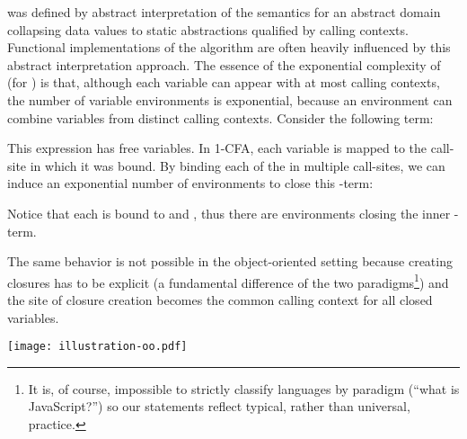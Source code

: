 \kCFA{} was defined by abstract interpretation of the \lc{} semantics for
an abstract domain collapsing data values to static abstractions
qualified by  calling contexts. Functional implementations of the
algorithm are often heavily influenced by this abstract interpretation
approach.  The essence of the exponential complexity of \kCFA{} (for
) is that, although each variable can appear with at most
 calling contexts, the number of variable environments is
exponential, because an environment can combine variables from
distinct calling contexts.  Consider the following term:

This expression has  free variables.  In 1-CFA, each variable is
mapped to the call-site in which it was bound.  By binding each of the
 in multiple call-sites, we can induce an exponential number of
environments to close this -term:

Notice that each  is bound to  and , thus there are 
environments closing the inner -term.

The same behavior is not possible in the object-oriented setting
because creating closures has to be explicit (a fundamental difference
of the two paradigms\footnote{It is, of course, impossible to strictly
classify languages by paradigm (``what is JavaScript?'') so our
statements reflect typical, rather than universal, practice.}) and the
site of closure creation becomes the common calling context for all
closed variables.

\begin{figure*}[tbp]
\begin{center}
\texttt{[image: illustration-oo.pdf]}

\caption{An example OO program, analyzed under 1-CFA{}. Parts that are
 orthogonal to the analysis (e.g., return types, the class containing
 \texttt{foo}, the body of \texttt{baz}) are elided. The bottom part
 shows the (points-to) results of the analysis in the form
 ``\emph{context}: \emph{var} \texttt{->} \emph{abstractObject}''.
 Conventions: we use \texttt{[ox1]}, ..., \texttt{[oxN]},
 \texttt{[oy1]}, ..., \texttt{[oyM]} to mean the abstract objects
 pointed to by the corresponding environment variables. (We only care
 that these objects be distinct.)  \emph{method}\texttt{\_}\emph{var}
 names a local variable, \emph{var} inside a
 method. \emph{method}\texttt{::}\emph{Type}\texttt{.}\emph{field}
 refers to a field of the object of type \emph{Type} allocated inside
 \emph{method}.  (This example allocates a single object per method,
 so no numeric distinction of allocation sites is necessary.)
 \emph{callermethod}\texttt{@}\emph{num} designates the \emph{num}-th
 call-site inside method \emph{callermethod}.}
\label{fig:illustration-oo}
\end{center}
\end{figure*}


